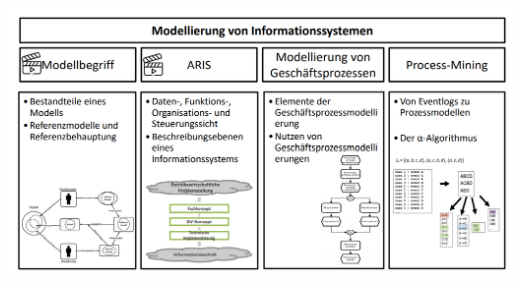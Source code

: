 \documentclass[a4]{scrartcl}
\begin{document}
\begin{center}
    \includegraphics[scale=0.7]{digi4.png}
\end{center}
\end{document}
